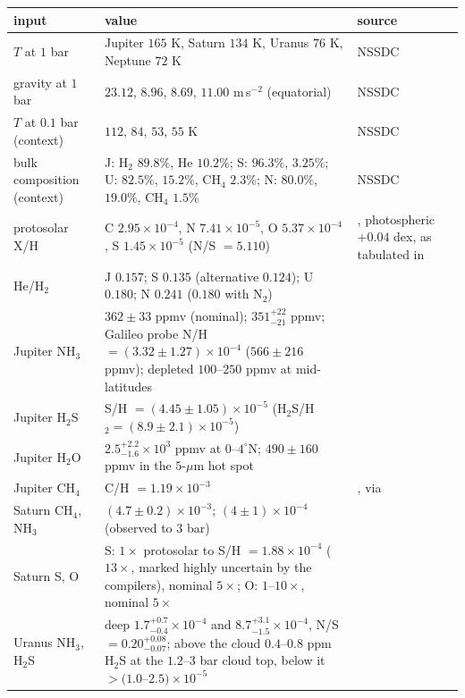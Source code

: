 \documentclass[11pt]{article}
\theoremstyle{definition}\newtheorem{definition}[theorem]{Definition}
\theoremstyle{remark}\newtheorem{remark}[theorem]{Remark}
\begin{document}
\begin{table}[!htb]\centering\footnotesize
\begin{tabular}{@{}>{\raggedright\arraybackslash}p{3.0cm}>{\raggedright\arraybackslash}p{8.1cm}>{\raggedright\arraybackslash}p{3.8cm}@{}}\toprule
input & value & source\\\midrule
$T$ at $1$ bar & Jupiter $165$ K, Saturn $134$ K, Uranus $76$ K, Neptune $72$ K & NSSDC \cite{NSSDCJ,NSSDCS,NSSDCU,NSSDCN}\\
gravity at $1$ bar & $23.12$, $8.96$, $8.69$, $11.00$ m\,s$^{-2}$ (equatorial) & NSSDC\\
$T$ at $0.1$ bar (context) & $112$, $84$, $53$, $55$ K & NSSDC\\
bulk composition (context) & J: H$_2$ $89.8\%$, He $10.2\%$; S: $96.3\%$, $3.25\%$; U: $82.5\%$, $15.2\%$, CH$_4$ $2.3\%$; N: $80.0\%$, $19.0\%$, CH$_4$ $1.5\%$ & NSSDC\\
protosolar X/H & C $2.95\times10^{-4}$, N $7.41\times10^{-5}$, O $5.37\times10^{-4}$, S $1.45\times10^{-5}$ (N/S $=5.110$) & \cite{Asplund2009}, photospheric $+0.04$ dex, as tabulated in \cite{Atreya2020}\\
He/H$_2$ & J $0.157$; S $0.135$ (alternative $0.124$); U $0.180$; N $0.241$ ($0.180$ with N$_2$) & \cite{Atreya2020}\\
Jupiter NH$_3$ & $362\pm33$ ppmv (nominal); $351^{+22}_{-21}$ ppmv; Galileo probe N/H $=(3.32\pm1.27)\times10^{-4}$ ($566\pm216$ ppmv); depleted $100$--$250$ ppmv at mid-latitudes & \cite{Li2017,Li2020,Wong2004,Guillot2020b}\\
Jupiter H$_2$S & S/H $=(4.45\pm1.05)\times10^{-5}$ (H$_2$S/H$_2=(8.9\pm2.1)\times10^{-5}$) & \cite{Wong2004}\\
Jupiter H$_2$O & $2.5^{+2.2}_{-1.6}\times10^3$ ppmv at $0$--$4^\circ$N; $490\pm160$ ppmv in the $5$-$\mu$m hot spot & \cite{Li2020,Wong2004}\\
Jupiter CH$_4$ & C/H $=1.19\times10^{-3}$ & \cite{Wong2004}, via \cite{Atreya2020}\\
Saturn CH$_4$, NH$_3$ & $(4.7\pm0.2)\times10^{-3}$; $(4\pm1)\times10^{-4}$ (observed to $3$ bar) & \cite{Fletcher2009,Atreya2020}\\
Saturn S, O & S: $1\times$ protosolar to S/H $=1.88\times10^{-4}$ ($13\times$, marked highly uncertain by the compilers), nominal $5\times$; O: $1$--$10\times$, nominal $5\times$ & \cite{Atreya2020,AtreyaWong}\\
Uranus NH$_3$, H$_2$S & deep $1.7^{+0.7}_{-0.4}\times10^{-4}$ and $8.7^{+3.1}_{-1.5}\times10^{-4}$, N/S $=0.20^{+0.08}_{-0.07}$; above the cloud $0.4$--$0.8$ ppm H$_2$S at the $1.2$--$3$ bar cloud top, below it $>(1.0$--$2.5)\times10^{-5}$ & \cite{Molter2021,Irwin2018}\\

\end{tabular}
\end{table}
\end{document}
